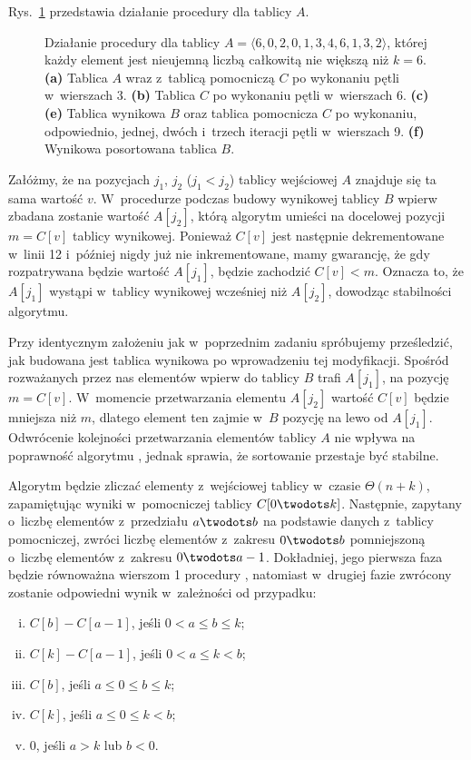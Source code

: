 
\exercise %
Rys.\ \ref{fig:8.2-1} przedstawia działanie procedury  dla tablicy $A$.
\begin{figure}[!ht]
	\centering 
	\caption{Działanie procedury  dla tablicy $A=\langle6,0,2,0,1,3,4,6,1,3,2\rangle$, której każdy element jest nieujemną liczbą całkowitą nie większą niż $k=6$.
{\sffamily\bfseries(a)} Tablica $A$ wraz z~tablicą pomocniczą $C$ po wykonaniu pętli w~wierszach 3.
{\sffamily\bfseries(b)} Tablica $C$ po wykonaniu pętli w~wierszach 6.
{\sffamily\bfseries(c)\nbendash(e)} Tablica wynikowa $B$ oraz tablica pomocnicza $C$ po wykonaniu, odpowiednio, jednej, dwóch i~trzech iteracji pętli  w~wierszach 9.
{\sffamily\bfseries(f)} Wynikowa posortowana tablica $B$.} \label{fig:8.2-1}
\end{figure}

\exercise %
Załóżmy, że na pozycjach $j_1$, $j_2$ ($j_1<j_2$) tablicy wejściowej $A$ znajduje się ta sama wartość $v$.
W~procedurze  podczas budowy wynikowej tablicy $B$ wpierw zbadana zostanie wartość $A[j_2]$, którą algorytm umieści na docelowej pozycji $m=C[v]$ tablicy wynikowej.
Ponieważ $C[v]$ jest następnie dekrementowane w~linii 12 i~później nigdy już nie inkrementowane, mamy gwarancję, że gdy rozpatrywana będzie wartość $A[j_1]$, będzie zachodzić $C[v]<m$.
Oznacza to, że $A[j_1]$ wystąpi w~tablicy wynikowej wcześniej niż $A[j_2]$, dowodząc stabilności algorytmu.

\exercise %
Przy identycznym założeniu jak w~poprzednim zadaniu spróbujemy prześledzić, jak budowana jest tablica wynikowa po wprowadzeniu tej modyfikacji.
Spośród rozważanych przez nas elementów wpierw do tablicy $B$ trafi $A[j_1]$, na pozycję $m=C[v]$.
W~momencie przetwarzania elementu $A[j_2]$ wartość $C[v]$ będzie mniejsza niż $m$, dlatego element ten zajmie w~$B$ pozycję na lewo od $A[j_1]$.
Odwrócenie kolejności przetwarzania elementów tablicy $A$ nie wpływa na poprawność algorytmu , jednak sprawia, że sortowanie przestaje być stabilne.

\exercise %
Algorytm będzie zliczać elementy z~wejściowej tablicy w~czasie $\Theta(n+k)$, zapamiętując wyniki w~pomocniczej tablicy $C[0\twodots k]$.
Następnie, zapytany o~liczbę elementów z~przedziału $a\twodots b$ na podstawie danych z~tablicy pomocniczej, zwróci liczbę elementów z~zakresu $0\twodots b$ pomniejszoną o~liczbę elementów z~zakresu $0\twodots a-1$.
Dokładniej, jego pierwsza faza będzie równoważna wierszom 1 procedury , natomiast w~drugiej fazie zwrócony zostanie odpowiedni wynik w~zależności od przypadku:
\begin{enumerate}[(i)]
	\item $C[b]-C[a-1]$, jeśli $0<a\le b\le k$;
	\item $C[k]-C[a-1]$, jeśli $0<a\le k<b$;
	\item $C[b]$, jeśli $a\le0\le b\le k$;
	\item $C[k]$, jeśli $a\le0\le k<b$;
	\item 0, jeśli $a>k$ lub $b<0$.
\end{enumerate}
